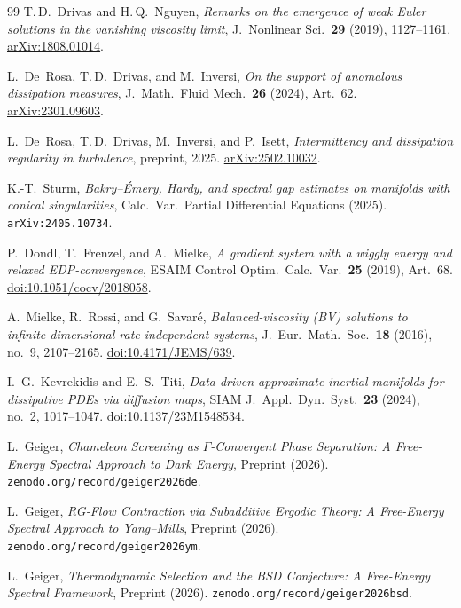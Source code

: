 \documentclass[12pt,a4paper]{article}
\theoremstyle{definition}
\theoremstyle{plain}
\theoremstyle{remark}
\begin{document}
\begin{thebibliography}{99}
T.\,D.~Drivas and H.\,Q.~Nguyen,
\emph{Remarks on the emergence of weak Euler solutions in the vanishing
viscosity limit},
J.~Nonlinear Sci.\ \textbf{29} (2019), 1127--1161.
\href{https://arxiv.org/abs/1808.01014}{arXiv:1808.01014}.

L.~De~Rosa, T.\,D.~Drivas, and M.~Inversi,
\emph{On the support of anomalous dissipation measures},
J.~Math.\ Fluid Mech.\ \textbf{26} (2024), Art.~62.
\href{https://arxiv.org/abs/2301.09603}{arXiv:2301.09603}.

L.~De~Rosa, T.\,D.~Drivas, M.~Inversi, and P.~Isett,
\emph{Intermittency and dissipation regularity in turbulence},
preprint, 2025.
\href{https://arxiv.org/abs/2502.10032}{arXiv:2502.10032}.

K.-T.~Sturm, \emph{Bakry--\'Emery, Hardy, and spectral gap estimates on manifolds with conical singularities}, Calc.\ Var.\ Partial Differential Equations (2025). \texttt{arXiv:2405.10734}.

P.~Dondl, T.~Frenzel, and A.~Mielke,
\emph{A gradient system with a wiggly energy and relaxed EDP-convergence},
ESAIM Control Optim.\ Calc.\ Var.\ \textbf{25} (2019), Art.~68.
\href{https://doi.org/10.1051/cocv/2018058}{doi:10.1051/cocv/2018058}.

A.~Mielke, R.~Rossi, and G.~Savar\'e,
\emph{Balanced-viscosity (BV) solutions to infinite-dimensional rate-independent systems},
J.~Eur.\ Math.\ Soc.\ \textbf{18} (2016), no.~9, 2107--2165.
\href{https://doi.org/10.4171/JEMS/639}{doi:10.4171/JEMS/639}.

I.~G.~Kevrekidis and E.~S.~Titi,
\emph{Data-driven approximate inertial manifolds for dissipative PDEs via diffusion maps},
SIAM J.\ Appl.\ Dyn.\ Syst.\ \textbf{23} (2024), no.~2, 1017--1047.
\href{https://doi.org/10.1137/23M1548534}{doi:10.1137/23M1548534}.

L.~Geiger,
\emph{Chameleon Screening as $\Gamma$-Convergent Phase Separation: A Free-Energy Spectral Approach to Dark Energy},
Preprint (2026). \texttt{zenodo.org/record/geiger2026de}.

L.~Geiger,
\emph{RG-Flow Contraction via Subadditive Ergodic Theory: A Free-Energy Spectral Approach to Yang--Mills},
Preprint (2026). \texttt{zenodo.org/record/geiger2026ym}.

L.~Geiger,
\emph{Thermodynamic Selection and the BSD Conjecture: A Free-Energy Spectral Framework},
Preprint (2026). \texttt{zenodo.org/record/geiger2026bsd}.


\end{thebibliography}
\end{document}
